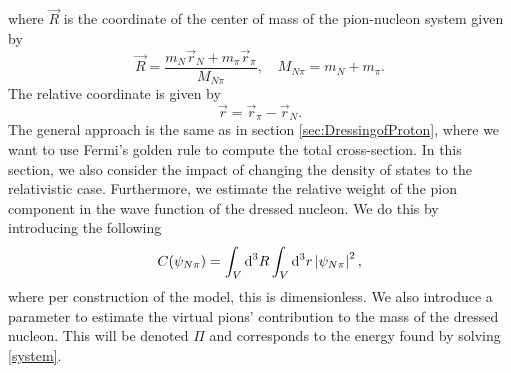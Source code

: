 where $\vec{R}$ is the coordinate of the center of mass of the pion-nucleon system given by
\begin{equation} \label{Rvec}
	\vec{R}=\frac{m_N \vec{r}_N+m_\pi \vec{r}_\pi}{M_{N\pi}}, \quad M_{N\pi} = m_N+m_\pi.
\end{equation}
The relative coordinate is given by
\begin{equation} \label{rvec}
	\vec{r} = \vec{r}_\pi-\vec{r}_N.
\end{equation}
The general approach is the same as in section \ref{sec:DressingofProton}, where we want to use Fermi's golden rule to compute the total cross-section. In this section, we also consider the impact of changing the density of states to the relativistic case. Furthermore, we estimate the relative weight of the pion component in the wave function of the dressed nucleon. We do this by introducing the following
\begin{equation} \label{relativeweight}
	C(\psi_{N\pi}) = \int_V \text{d}^3 R \int_V \text{d}^3 r \, \abs{\psi_{N\pi}}^2,
\end{equation}
where per construction of the model, this is dimensionless. We also introduce a parameter to estimate the virtual pions' contribution to the mass of the dressed nucleon. This will be denoted $\Pi$ and corresponds to the energy found by solving \eqref{system}.

